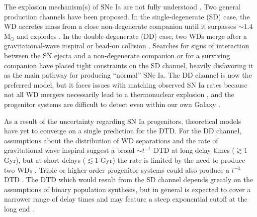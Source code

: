 \documentclass[twocolumn,twocolappendix]{aastex631}
\begin{document}
The explosion mechanism(s) of SNe Ia are not fully understood \citep[for reviews, see][]{Maoz2014-Review,Livio2018-ProgenitorReview,Ruiter2020-ProgenitorReview,Liu2023-SNIaBinaryReview}. Two general production channels have been proposed. In the single-degenerate (SD) case, the WD accretes mass from a close non-degenerate companion until it surpasses $\sim1.4$ M$_\odot$ and explodes \citep{Whelan1973-SDModel,Nomoto1982-SDModel,Yoon2003-SDModel}. In the double-degenerate (DD) case, two WDs merge after a gravitational-wave inspiral \citep{Iben1984-IaBinary,Webbink1984-DDModel,Pakmor2012-WDMerger} or head-on collision \citep{Benz1989-CollisionalDD,Thompson2011-CollisionalDD}. Searches for signs of interaction between the SN ejecta and a non-degenerate companion \citep[e.g.,][]{Panagia2006-RadioEmission,Chomiuk2016-RadioEmission,Fausnaugh2019-EarlyIaLightCurves,Tucker2020-SNeIaSpectra,Dubay2022-SNeIaCSM} or for a surviving companion \citep[e.g.,][]{Schaefer2012-ExCompanionSNR,Do2021-Progenitor1972E,Tucker2023-SN2011fe} have placed tight constraints on the SD channel, heavily disfavoring it as the main pathway for producing ``normal'' SNe Ia. The DD channel is now the preferred model, but it faces issues with matching observed SN Ia rates because not all WD mergers necessarily lead to a thermonuclear explosion \citep[e.g.,][]{NomotoIben1985-DDMergers,SaioNomoto1998-DDMergers,Shen2012-DDMergers}, and the progenitor systems are difficult to detect even within our own Galaxy \citep{RebassaMansergas2019-WhereAreDDProgenitors}.

As a result of the uncertainty regarding SN Ia progenitors, theoretical models have yet to converge on a single prediction for the DTD. For the DD channel, assumptions about the distribution of WD separations and the rate of gravitational wave inspiral suggest a broad $\sim t^{-1}$ DTD at long delay times ($\gtrsim 1$ Gyr), but at short delays ($\lesssim 1$ Gyr) the rate is limited by the need to produce two WDs \citep[see][]{Greggio2005-AnalyticalRates,Maoz2014-Review}. Triple or higher-order progenitor systems could also produce a $t^{-1}$ DTD \citep{Fang2018-QuadrupleSystems,Rajamuthukumar2023-TripleEvolution}. The DTD which would result from the SD channel depends greatly on the assumptions of binary population synthesis, but in general is expected to cover a narrower range of delay times and may feature a steep exponential cutoff at the long end \citep[e.g.,][]{Greggio2005-AnalyticalRates}.
\end{document}
